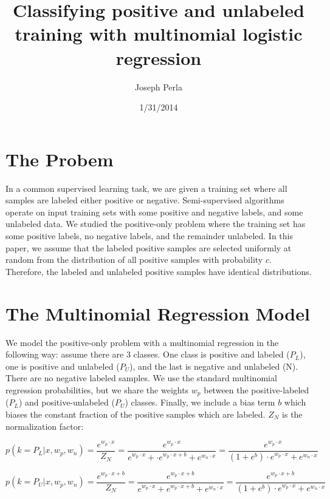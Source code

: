 \documentclass[]{article}
\begin{document}
\title{Classifying positive and unlabeled training  with multinomial logistic regression}
\author{Joseph Perla}
\date{1/31/2014}
\maketitle

\section{The Probem}

In a common supervised learning task, we are given a training set where all samples are labeled either positive or negative. Semi-supervised algorithms operate on input training sets with some positive and negative labels, and some unlabeled data.  We studied the positive-only problem where the training set has some positive labels, no negative labels, and the remainder unlabeled.  In this paper, we assume that the labeled positive samples are selected uniformly at random from the distribution of all positive samples with probability $c$. Therefore, the labeled and unlabeled positive samples have identical distributions.

\section{The Multinomial Regression Model}

We model the positive-only problem with a multinomial regression in the following way: assume there are 3 classes.  One class is positive and labeled ($P_L$), one is positive and unlabeled ($P_U$), and the last is negative and unlabeled (N).  There are no negative labeled samples.  We use the standard multinomial regression probabilities, but we share the weights $w_p$ between the positive-labeled ($P_L$) and positive-unlabeled ($P_U$) classes. Finally, we include a bias term $b$ which biases the constant fraction of the positive samples which are labeled.  $Z_N$ is the normalization factor:

$$
p(k=P_L | x, w_p, w_n) =  \frac{e^{w_p \cdot x}}{Z_N} = \frac{e^{w_p \cdot x}}{e^{w_p \cdot x} + \cdot e^{w_p \cdot x + b} + e^{w_n \cdot x}} = \frac{e^{w_p \cdot x}}{(1 + e^{b}) \cdot e^{w_p \cdot x} + e^{w_n \cdot x}}
$$

$$
p(k=P_U | x, w_p, w_n) =  \frac{e^{w_p \cdot x + b}}{Z_N} = \frac{e^{w_p \cdot x + b}}{e^{w_p \cdot x} + e^{w_p \cdot x + b} + e^{w_n \cdot x}} = \frac{e^{w_p \cdot x + b}}{(1 + e^{b}) \cdot e^{w_p \cdot x} + e^{w_n \cdot x}}
$$
\end{document}
